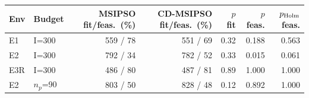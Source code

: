 \begin{tabular}{llrrrrr}
\toprule
Env & Budget & MSIPSO fit/feas.\ (\%) & CD-MSIPSO fit/feas.\ (\%) & $p$ fit & $p$ feas. & $p_{\rm Holm}$ feas.\\
\midrule
E1 & I=300 & 559 / 78 & 551 / 69 & 0.32 & 0.188 & 0.563\\
E2 & I=300 & 792 / 34 & 782 / 52 & 0.33 & 0.015 & 0.061\\
E3R & I=300 & 486 / 80 & 487 / 81 & 0.89 & 1.000 & 1.000\\
E2 & $n_p$=90 & 803 / 50 & 828 / 48 & 0.12 & 0.892 & 1.000\\
\bottomrule
\end{tabular}